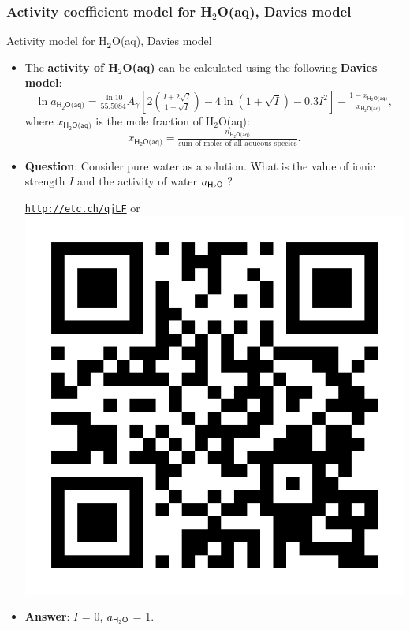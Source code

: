 \subsubsection{Activity coefficient model for H$_2$O(aq), Davies model}
%
%
\begin{frame}{Activity model for H$_{\boldsymbol{2}}$O(aq), Davies model}
\begin{itemize}
\item The \textbf{activity of H$_{2}$O(aq)} can be calculated
using the following \alert{\textbf{Davies model}}:
\[
\boxed{\ln a_{\mathsf{H_{2}O\text{(aq)}}}=\tfrac{\ln10}{55.5084}A_{\gamma}\left[2\left(\tfrac{I+2\sqrt{I}}{1+\sqrt{I}}\right)-4\ln(1+\sqrt{I})-0.3I^{2}\right]-\tfrac{1-x_{\mathsf{\mathsf{H_{2}O\text{(aq)}}}}}{x_{\mathsf{\mathsf{H_{2}O\text{(aq)}}}}}},
\]
where $x_{\mathsf{H_{2}O\text{(aq)}}}$ is the mole fraction of H$_{2}$O(aq):{\small{}
\[
x_{\mathsf{H_{2}O\text{(aq)}}}=\tfrac{n_{\mathsf{H_{2}O\text{(aq)}}}}{\text{sum of moles of all aqueous species}}.
\]
}{\small\par}
\pause
\item \alert{\textbf{Question}}: Consider pure water as a solution.
What is the value of ionic strength $I$ and the activity of water $a_{\sf H_2O}$ ?  
\begin{center}
	\href{http://etc.ch/qjLF}{\textcolor{indigo(dye)}{\tt http://etc.ch/qjLF}} \quad or \quad 
	\includegraphics[height=0.1\columnwidth]{figures/activity-models/poll-ionic-strength.png}
\end{center}
\hiddenpause
\item \textbf{Answer}: $I$ = 0, $a_{\sf H_2O}$ = 1.
\end{itemize}
\end{frame}
%
%
